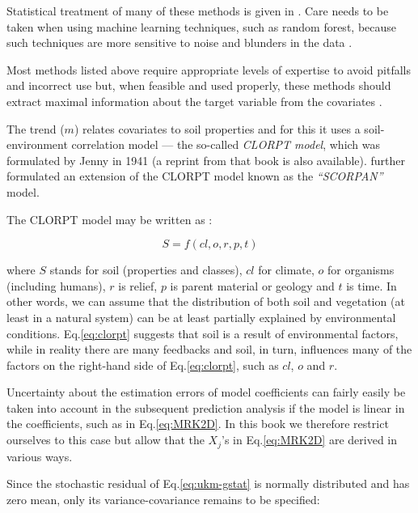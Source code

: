 \documentclass[graybox,natbib,nospthms,UStrade]{svmono}
\begin{document}
Statistical treatment of many of these methods is given in \citet{hastie2009elements}.
Care needs to be taken when using machine learning techniques, such as random forest,
because such techniques are more sensitive to noise and blunders in
the data .

Most methods listed above require appropriate levels of expertise to
avoid pitfalls and incorrect use but, when feasible and used properly,
these methods should extract maximal information about the target
variable from the covariates \citep{Statnikov2008, kanevski2009machine}.

The trend (\(m\)) relates covariates to soil properties and for this it
uses a soil-environment correlation model --- the so-called \emph{CLORPT
model}, which was formulated by Jenny in 1941 (a \citeyearpar{jenny1994factors}
reprint from that book is also available). \citet{McBratney2003Geoderma}
further formulated an extension of the CLORPT model
known as the \emph{``SCORPAN''} model.

The CLORPT model may be written as \citep{jenny1994factors, Florinsky2012Dokuchaev}:

\begin{equation}
S = f (cl, o, r, p, t)
\label{eq:clorpt}
\end{equation}

where \(S\) stands for soil (properties and classes), \(cl\) for climate,
\(o\) for organisms (including humans), \(r\) is relief, \(p\) is parent
material or geology and \(t\) is time. In other words, we can assume that
the distribution of both soil and vegetation (at least in a natural system)
can be at least partially explained by environmental conditions.
Eq.\eqref{eq:clorpt} suggests that soil is a result of environmental
factors, while in reality there are many feedbacks and soil, in turn, influences
many of the factors on the right-hand side of Eq.\eqref{eq:clorpt}, such
as \(cl\), \(o\) and \(r\).

Uncertainty about the estimation errors of model coefficients can fairly
easily be taken into account in the subsequent prediction analysis if
the model is linear in the coefficients, such as in Eq.\eqref{eq:MRK2D}.
In this book we therefore restrict ourselves to this case but allow that
the \(X_j\)'s in Eq.\eqref{eq:MRK2D} are derived in various ways.

Since the stochastic residual of Eq.\eqref{eq:ukm-gstat} is normally
distributed and has zero mean, only its variance-covariance remains to
be specified:
\end{document}
